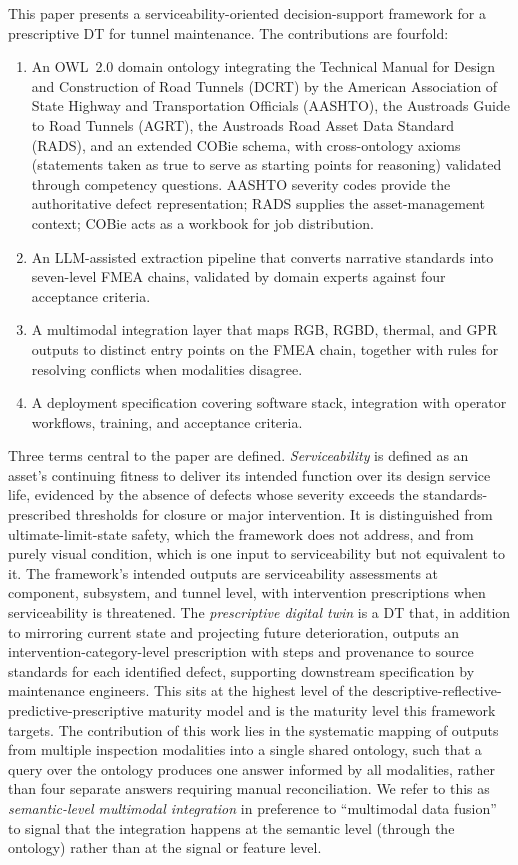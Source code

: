 \documentclass[11pt,a4paper]{article}
\begin{document}
This paper presents a serviceability-oriented decision-support framework for a prescriptive DT for tunnel maintenance. The contributions are fourfold:
\begin{enumerate}[leftmargin=*]
  \item An OWL~2.0 domain ontology integrating the Technical Manual for Design and Construction of Road Tunnels (DCRT) by the American Association of State Highway and Transportation Officials (AASHTO), the Austroads Guide to Road Tunnels (AGRT), the Austroads Road Asset Data Standard (RADS), and an extended COBie schema, with cross-ontology axioms (statements taken as true to serve as starting points for reasoning) validated through competency questions. AASHTO severity codes provide the authoritative defect representation; RADS supplies the asset-management context; COBie acts as a workbook for job distribution.
  \item An LLM-assisted extraction pipeline that converts narrative standards into seven-level FMEA chains, validated by domain experts against four acceptance criteria.
  \item A multimodal integration layer that maps RGB, RGBD, thermal, and GPR outputs to distinct entry points on the FMEA chain, together with rules for resolving conflicts when modalities disagree.
  \item A deployment specification covering software stack, integration with operator workflows, training, and acceptance criteria.
\end{enumerate}

Three terms central to the paper are defined. \emph{Serviceability} is defined as an asset's continuing fitness to deliver its intended function over its design service life, evidenced by the absence of defects whose severity exceeds the standards-prescribed thresholds for closure or major intervention. It is distinguished from ultimate-limit-state safety, which the framework does not address, and from purely visual condition, which is one input to serviceability but not equivalent to it. The framework's intended outputs are serviceability assessments at component, subsystem, and tunnel level, with intervention prescriptions when serviceability is threatened. The \emph{prescriptive digital twin} is a DT that, in addition to mirroring current state and projecting future deterioration, outputs an intervention-category-level prescription with steps and provenance to source standards for each identified defect, supporting downstream specification by maintenance engineers. This sits at the highest level of the descriptive-reflective-predictive-prescriptive maturity model and is the maturity level this framework targets. The contribution of this work lies in the systematic mapping of outputs from multiple inspection modalities into a single shared ontology, such that a query over the ontology produces one answer informed by all modalities, rather than four separate answers requiring manual reconciliation. We refer to this as \emph{semantic-level multimodal integration} in preference to ``multimodal data fusion'' to signal that the integration happens at the semantic level (through the ontology) rather than at the signal or feature level.
\end{document}

